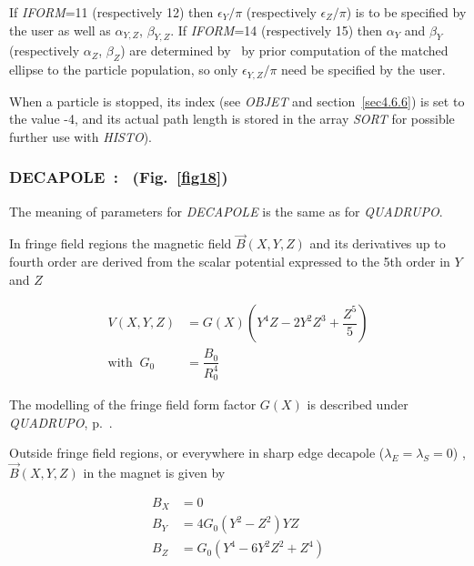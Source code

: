 \noindent If \textsl{IFORM}=11 (respectively 12) then $\epsilon_Y/\pi$  (respectively $\epsilon_Z/\pi$) 
is to be specified by the user as well as $\alpha_{Y,Z}$, $\beta_{Y,Z}$. 
If \textsl{IFORM}=14 (respectively 15) then $\alpha_Y$ and  $\beta_Y$  (respectively $\alpha_Z$,  $\beta_Z$) 
are  determined by \zgoubi\ by prior computation of the 
matched ellipse to the particle population, so only $\epsilon_{Y,Z}/\pi$ need be specified by the user. 




\bigskip

\noindent When a particle is stopped, its index \IEX{} (see \textsl{OBJET}
and section~\ref{sec4.6.6}) is set to the value -4, and its actual path length is stored in 
the array \textsl{SORT}  for possible further use with \textsl{HISTO}). 


\newpage

\subsubsection*{DECAPOLE~:  \DECAPOLETitl\ (Fig.~\protect\ref{fig18})} \label{DECAPOLE} 
\medskip

The meaning of parameters for \textsl{DECAPOLE}  is the same as for \textsl{QUADRUPO}.  

\noindent In fringe field regions the magnetic field $ \vec  B(X,Y,Z) $ and
its derivatives up to fourth order are derived from the scalar potential expressed to 
the 5th order in $ Y $ and $ Z $ 

\begin{align*}
	V(X,Y,Z) &   =    G(X) \left(Y^4Z-2Y^2Z^3+ \dfrac{Z^5 }{ 5}\right)  \\
	\text{with  } ~ G_0 &   = \dfrac{ B_0 }{ R^4_0} 
\end{align*}

\noindent The  modelling of the fringe field form factor  $G(X)$
 is described under \textsl{QUADRUPO}, p.~\pageref{QUADRUPO}. 

\bigskip

\noindent Outside fringe field regions, or everywhere in sharp edge decapole 
($ \lambda_ E=\lambda_ S=0$) , $ \vec  B(X,Y,Z) $ in the magnet is given by 

\begin{align*}
	B_X &   =    0 \\
	B_Y &   =   4G_0(Y^2-Z^2)YZ \\
	B_Z &   =    G_0(Y^4-6Y^2Z^2+Z^4)
\end{align*}
\vfill

